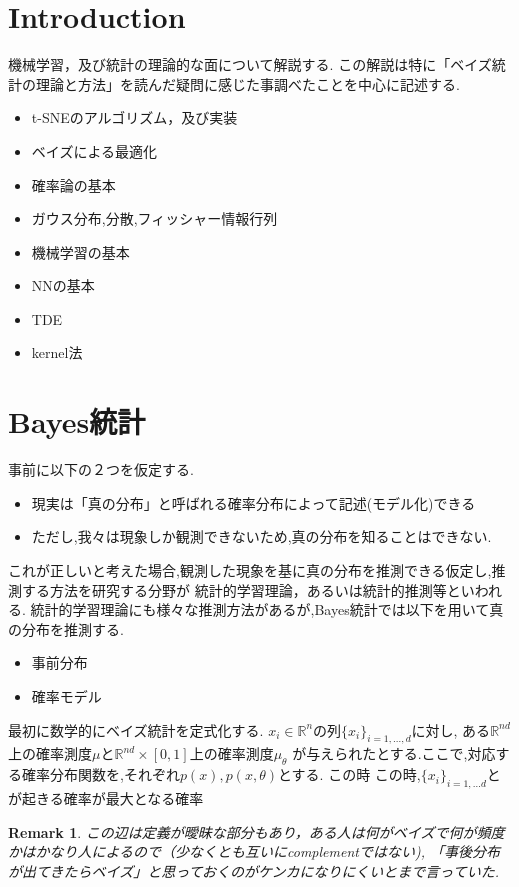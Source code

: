 \documentclass{ujarticle}
\newtheorem*{rem}{Remark}
\begin{document}
\section{Introduction}
\label{sec:Introduction}
機械学習，及び統計の理論的な面について解説する.
この解説は特に「ベイズ統計の理論と方法」を読んだ疑問に感じた事調べたことを中心に記述する.

\begin{itemize}
  \item t-SNEのアルゴリズム，及び実装
  \item ベイズによる最適化
  \item 確率論の基本
  \item ガウス分布,分散,フィッシャー情報行列
  \item 機械学習の基本
  \item NNの基本
  \item TDE
  \item kernel法
\end{itemize}


\section{Bayes統計}
\label{sec:Bayes統計}


事前に以下の２つを仮定する.
\begin{itemize}
  \item 現実は「真の分布」と呼ばれる確率分布によって記述(モデル化)できる
  \item ただし,我々は現象しか観測できないため,真の分布を知ることはできない.
\end{itemize}
これが正しいと考えた場合,観測した現象を基に真の分布を推測できる仮定し,推測する方法を研究する分野が
統計的学習理論，あるいは統計的推測等といわれる.
統計的学習理論にも様々な推測方法があるが,Bayes統計では以下を用いて真の分布を推測する.
\begin{itemize}
  \item 事前分布
  \item 確率モデル
\end{itemize}

最初に数学的にベイズ統計を定式化する.
$x_i \in \mathbb{R}^n$の列$\{ x_i \}_{i= 1,\dots ,d}$に対し,
ある$\mathbb{R}^{nd}$上の確率測度$\mu$と$\mathbb{R}^{nd}\times [0,1]$上の確率測度$\mu_{\theta}$
が与えられたとする.ここで,対応する確率分布関数を,それぞれ$p(x),p(x,\theta)$とする.
この時
この時,$\{ x_i \}_{i= 1,\dots d}$とが起きる確率が最大となる確率


\begin{rem}
この辺は定義が曖昧な部分もあり，ある人は何がベイズで何が頻度かはかなり人によるので（少なくとも互いにcomplementではない),
「事後分布が出てきたらベイズ」と思っておくのがケンカになりにくいとまで言っていた.
\end{rem}
\end{document}
